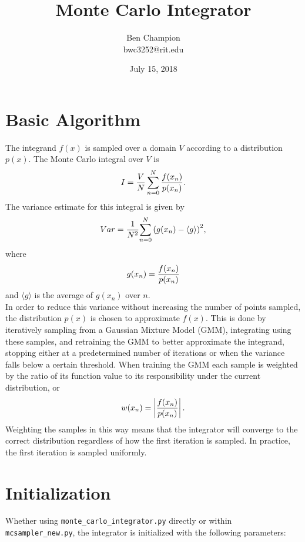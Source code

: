\documentclass{article}
\title{Monte Carlo Integrator}
\date{July 15, 2018}
\author{Ben Champion \\ bwc3252@rit.edu}
\begin{document}
\maketitle

\section{Basic Algorithm}

The integrand $f(x)$ is sampled over a domain $V$ according to a distribution
$p(x)$. The Monte Carlo integral over $V$ is
\begin{equation}
    I = {{V \over N} \sum_{n=0}^{N} {f(x_n) \over {p(x_n)}}}.
\end{equation}
The variance estimate for this integral is given by
\begin{equation}
    Var = {1 \over N^2}{\sum\limits_{n=0}^{N} {(g(x_n) - \langle g \rangle)}^2},
\end{equation}
where
\begin{equation}
    g(x_n) = {f(x_n) \over {p(x_n)}}
\end{equation}
and $\langle g \rangle$ is the average of $g(x_n)$ over $n$. \\

In order to reduce this variance without increasing the number of points
sampled, the distribution $p(x)$ is chosen to approximate $f(x)$. This is done
by iteratively sampling from a Gaussian Mixture Model (GMM), integrating using
these samples, and retraining the GMM to better approximate the integrand,
stopping either at a predetermined number of iterations or when the variance
falls below a certain threshold. When training the GMM each sample is weighted
by the ratio of its function value to its responsibility under the current
distribution, or
\begin{equation}
    w(x_n) = \left| {f(x_n) \over p(x_n)} \right|.
\end{equation}
Weighting the samples in this way means that the integrator will converge to
the correct distribution regardless of how the first iteration is sampled. In
practice, the first iteration is sampled uniformly.

\section{Initialization}

Whether using \texttt{monte\_carlo\_integrator.py} directly or within
\texttt{mcsampler\_new.py}, the integrator is initialized with the following
parameters:
\end{document}
